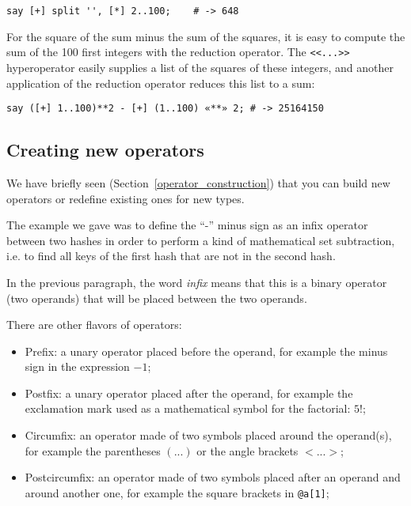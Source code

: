 \begin{verbatim}
say [+] split '', [*] 2..100;    # -> 648
\end{verbatim}

For the square of the sum minus the sum of the squares, 
it is easy to compute the sum of the 100 first integers 
with the reduction operator. The \verb'<<...>>' 
hyperoperator easily supplies a list of the squares of 
these integers, and another application of the reduction 
operator reduces this list to a sum:

\begin{verbatim}
say ([+] 1..100)**2 - [+] (1..100) «**» 2; # -> 25164150
\end{verbatim}

\subsection{Creating new operators}

We have briefly seen (Section~\ref{operator_construction}) 
that you can build new operators or redefine existing ones 
for new types.

The example we gave was to define the ``-'' minus sign 
as an infix operator between two hashes in order to 
perform a kind of mathematical set subtraction, i.e. 
to find all keys of the first hash that are not in the 
second hash.

In the previous paragraph, the word \emph{infix} means 
that this is a binary operator (two operands) that will 
be placed between the two operands. 

There are other flavors of operators:
\begin{itemize}
\item Prefix: a unary operator placed before the operand, 
for example the minus sign in the expression $-1$;

\item Postfix: a unary operator placed after the operand, 
for example the exclamation mark used as a mathematical  
symbol for the factorial: $5!$;

\item Circumfix: an operator made of two symbols placed 
around the operand(s), for example the parentheses $(...)$ 
or the angle brackets $<...>$;

\item Postcircumfix: an operator made of two symbols placed 
after an operand and around another one, for example the 
square brackets in \verb'@a[1]';
\end{itemize}

